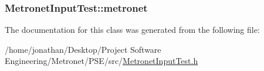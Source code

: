 \subsubsection[{\texorpdfstring{metronet}{metronet}}]{ Metronet\+Input\+Test\+::metronet\hspace{0.3cm}{\ttfamily [protected]}}\hypertarget{class_metronet_input_test_ab922ed7c2e4f1dfee1ed7df1eb3a13b4}{}\label{class_metronet_input_test_ab922ed7c2e4f1dfee1ed7df1eb3a13b4}


The documentation for this class was generated from the following file\+:\begin{DoxyCompactItemize}
\item 
/home/jonathan/\+Desktop/\+Project Software Engineering/\+Metronet/\+P\+S\+E/src/\hyperlink{_metronet_input_test_8h}{Metronet\+Input\+Test.\+h}\end{DoxyCompactItemize}
